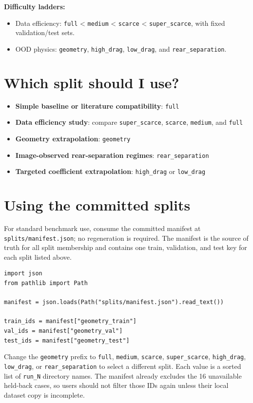 \documentclass[10pt]{article}
\newcommand{\code}[1]{\texttt{#1}}
\newcommand{\splitkey}[1]{\texttt{#1}}
\begin{document}
\textbf{Difficulty ladders:}
\begin{itemize}
  \item Data efficiency: \splitkey{full} < \splitkey{medium} < \splitkey{scarce} < \splitkey{super\_scarce}, with fixed validation/test sets.
  \item OOD physics: \splitkey{geometry}, \splitkey{high\_drag}, \splitkey{low\_drag}, and \splitkey{rear\_separation}.
\end{itemize}

\section*{Which split should I use?}

\begin{itemize}
  \item \textbf{Simple baseline or literature compatibility}: \splitkey{full}
  \item \textbf{Data efficiency study}: compare \splitkey{super\_scarce}, \splitkey{scarce}, \splitkey{medium}, and \splitkey{full}
  \item \textbf{Geometry extrapolation}: \splitkey{geometry}
  \item \textbf{Image-observed rear-separation regimes}: \splitkey{rear\_separation}
  \item \textbf{Targeted coefficient extrapolation}: \splitkey{high\_drag} or \splitkey{low\_drag}
\end{itemize}

\section*{Using the committed splits}

For standard benchmark use, consume the committed manifest at
\code{splits/manifest.json}; no regeneration is required. The manifest is the
source of truth for all split membership and contains one train, validation,
and test key for each split listed above.

\begin{verbatim}
import json
from pathlib import Path

manifest = json.loads(Path("splits/manifest.json").read_text())

train_ids = manifest["geometry_train"]
val_ids = manifest["geometry_val"]
test_ids = manifest["geometry_test"]
\end{verbatim}

Change the \code{geometry} prefix to \code{full}, \code{medium},
\code{scarce}, \code{super\_scarce}, \code{high\_drag}, \code{low\_drag}, or
\code{rear\_separation} to select a different split. Each value is a sorted
list of \code{run\_N} directory names. The manifest already excludes the 16
unavailable held-back cases, so users should not filter those IDs again unless
their local dataset copy is incomplete.
\end{document}
